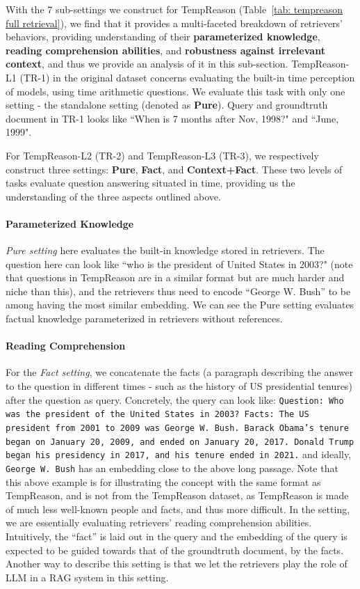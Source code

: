 \documentclass{article} %
\begin{document}
With the 7 sub-settings we construct for TempReason (Table~\ref{tab: tempreason full retrieval}), we find that it provides a multi-faceted breakdown of retrievers' behaviors, providing understanding of their \textbf{parameterized knowledge}, \textbf{reading comprehension abilities}, and \textbf{robustness against irrelevant context}, and thus we provide an analysis of it in this sub-section.
TempReason-L1 (TR-1) in the original dataset concerns evaluating the built-in time perception of models, using time arithmetic questions. We evaluate this task with only one setting - the standalone setting (denoted as \textbf{Pure}). Query and groundtruth document in TR-1 looks like ``When is 7 months after Nov, 1998?" and ``June, 1999". 

For TempReason-L2 (TR-2) and TempReason-L3 (TR-3), we respectively construct three settings: \textbf{Pure}, \textbf{Fact}, and \textbf{Context+Fact}. These two levels of tasks evaluate question answering situated in time, providing us the understanding of the three aspects outlined above.

\paragraph{Parameterized Knowledge} \textit{Pure setting} here evaluates the built-in knowledge stored in retrievers. The question here can look like ``who is the president of United States in 2003?" (note that questions in TempReason are in a similar format but are much harder and niche than this), and the retrievers thus need to encode ``George W. Bush'' to be among having the most similar embedding. We can see the Pure setting evaluates  factual knowledge parameterized in retrievers without references. 

\paragraph{Reading Comprehension} For the \textit{Fact setting}, we concatenate the facts (a paragraph describing the answer to the question in different times - such as the history of US presidential tenures) after the question as query. Concretely, the query can look like: \texttt{Question: Who was the president of the United States in 2003? Facts: The US president from 2001 to 2009 was George W. Bush. Barack Obama's tenure began on January 20, 2009, and ended on January 20, 2017. Donald Trump began his presidency in 2017, and his tenure ended in 2021.} and ideally, \texttt{George W. Bush} has an embedding close to the above long passage. Note that this above example is for illustrating the concept with the same format as TempReason, and is not from the TempReason dataset, as TempReason is made of much less well-known people and facts, and thus more difficult. In the setting, we are essentially evaluating retrievers' reading comprehension abilities. Intuitively, the ``fact'' is laid out in the query and the embedding of the query is expected to be guided towards that of the groundtruth document, by the facts. Another way to describe this setting is that we let the retrievers play the role of LLM in a RAG system in this setting.
\end{document}
